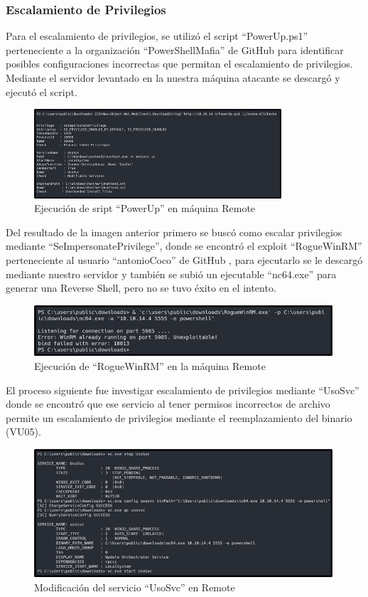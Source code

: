 \subsubsection{Escalamiento de Privilegios}
Para el escalamiento de privilegios, se utilizó el script “PowerUp.ps1” perteneciente a la organización “PowerShellMafia” de GitHub \cite{powerup} para identificar posibles configuraciones incorrectas que permitan el escalamiento de privilegios. Mediante el servidor levantado en la nuestra máquina atacante se descargó y ejecutó el script.
\begin{figure}[H]
    \centering
    \includegraphics[width=0.82\textwidth]{imagenes/powerrem.png}
    \caption{Ejecución de sript ``PowerUp'' en máquina Remote}
\end{figure}
Del resultado de la imagen anterior primero se buscó como escalar privilegios mediante “SeImpersonatePrivilege”, donde se encontró el exploit “RogueWinRM” perteneciente al usuario “antonioCoco” de GitHub \cite{roguewin}, para ejecutarlo se le descargó mediante nuestro servidor y también se subió un ejecutable “nc64.exe” para generar una Reverse Shell, pero no se tuvo éxito en el intento.
\begin{figure}[H]
    \centering
    \includegraphics[width=0.99\textwidth]{imagenes/roguerem.png}
    \caption{Ejecución de ``RogueWinRM'' en la máquina Remote}
\end{figure}
El proceso siguiente fue investigar escalamiento de privilegios mediante “UsoSvc” donde se encontró que ese servicio al tener permisos incorrectos de archivo permite un escalamiento de privilegios mediante el reemplazamiento del binario (VU05).
\begin{figure}[H]
    \centering
    \includegraphics[width=0.99\textwidth]{imagenes/usorem.png}
    \caption{Modificación del servicio ``UsoSvc'' en Remote}
\end{figure}
